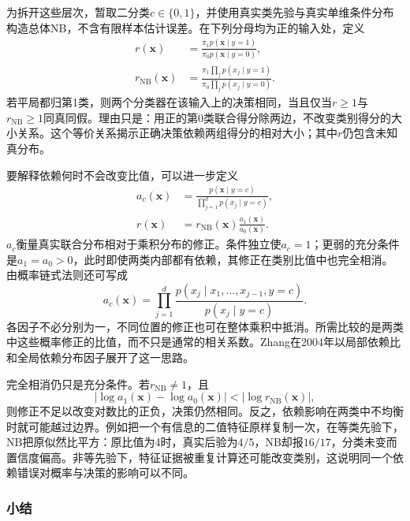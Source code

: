 为拆开这些层次，暂取二分类$c\in\{0,1\}$，并使用真实类先验与真实单维条件分布构造总体NB，不含有限样本估计误差。在下列分母均为正的输入处，定义
\begin{equation}
  \label{eq:classification-naive-bayes-ratios}
  \begin{aligned}
    r(\bm{x})
      &=\frac{\pi_1p(\bm{x}\mid y=1)}
              {\pi_0p(\bm{x}\mid y=0)},\\
    r_{\mathrm{NB}}(\bm{x})
      &=\frac{\pi_1\prod_jp(x_j\mid y=1)}
              {\pi_0\prod_jp(x_j\mid y=0)}.
  \end{aligned}
\end{equation}
若平局都归第1类，则两个分类器在该输入上的决策相同，当且仅当$r\geq1$与$r_{\mathrm{NB}}\geq1$同真同假。理由只是：用正的第0类联合得分除两边，不改变类别得分的大小关系。这个等价关系揭示正确决策依赖两组得分的相对大小；其中$r$仍包含未知真分布。

要解释依赖何时不会改变比值，可以进一步定义
\begin{equation}
  \label{eq:classification-naive-bayes-dependence}
  \begin{aligned}
    a_c(\bm{x})
      &=\frac{p(\bm{x}\mid y=c)}
              {\prod_{j=1}^{d}p(x_j\mid y=c)},\\
    r(\bm{x})
      &=r_{\mathrm{NB}}(\bm{x})
        \frac{a_1(\bm{x})}{a_0(\bm{x})}.
  \end{aligned}
\end{equation}
$a_c$衡量真实联合分布相对于乘积分布的修正。条件独立使$a_c=1$；更弱的充分条件是$a_1=a_0>0$，此时即使两类内部都有依赖，其修正在类别比值中也完全相消。由概率链式法则还可写成
\[
  a_c(\bm{x})
  =\prod_{j=1}^{d}
    \frac{p(x_j\mid x_1,\ldots,x_{j-1},y=c)}
         {p(x_j\mid y=c)}.
\]
各因子不必分别为一，不同位置的修正也可在整体乘积中抵消。所需比较的是两类中这些概率修正的比值，而不只是通常的相关系数。Zhang在2004年以局部依赖比和全局依赖分布因子展开了这一思路。

完全相消仍只是充分条件。若$r_{\mathrm{NB}}\neq1$，且
\[
  \left|\log a_1(\bm{x})-\log a_0(\bm{x})\right|
  <\left|\log r_{\mathrm{NB}}(\bm{x})\right|,
\]
则修正不足以改变对数比的正负，决策仍然相同。反之，依赖影响在两类中不均衡时就可能越过边界。例如把一个有信息的二值特征原样复制一次，在等类先验下，NB把原似然比平方：原比值为4时，真实后验为$4/5$，NB却报$16/17$，分类未变而置信度偏高。非等先验下，特征证据被重复计算还可能改变类别，这说明同一个依赖错误对概率与决策的影响可以不同。

\subsubsection{小结}
\label{sec:classification-naive-bayes-summary}

